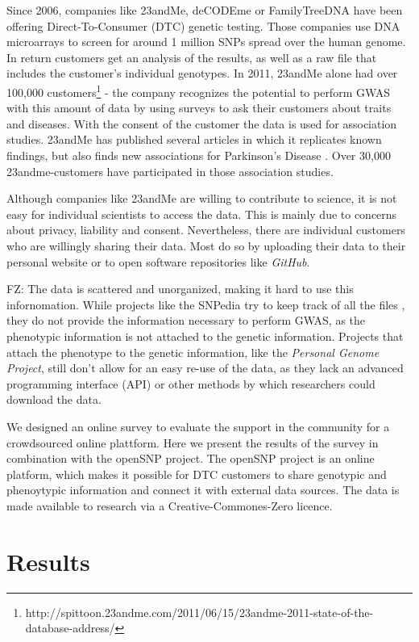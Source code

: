 \documentclass[10pt]{article}
\begin{document}
Since 2006, companies like 23andMe, deCODEme or FamilyTreeDNA have been offering Direct-To-Consumer (DTC) genetic testing. Those companies use DNA microarrays to screen for around 1 million SNPs spread over the human genome. In return customers get an analysis of the results, as well as a raw file that includes the customer's individual genotypes. In 2011, 23andMe alone had over 100,000 customers\footnote{http://spittoon.23andme.com/2011/06/15/23andme-2011-state-of-the-database-address/} - the company recognizes the potential to perform GWAS with this amount of data by using surveys to ask their customers about traits and diseases. With the consent of the customer the data is used for association studies. 23andMe has published several articles in which it replicates known findings, but also finds new associations for Parkinson's Disease \cite{Eriksson2010, Do2011}. Over 30,000 23andme-customers have participated in those association studies.  

Although companies like 23andMe are willing to contribute to science, it is not easy for individual scientists to access the data. This is mainly due to concerns about privacy, liability and consent. Nevertheless, there are individual customers who are willingly sharing their data. Most do so by uploading their data to their personal website or to open software repositories like \textit{GitHub}. 

FZ: The data is scattered and unorganized, making it hard to use this infornomation. While projects like the SNPedia try to keep track of all the files \cite{Cariaso2011}, they do not provide the information necessary to perform GWAS, as the phenotypic information is not attached to the genetic information. Projects that attach the phenotype to the genetic information, like the \textit{Personal Genome Project}, still don't allow for an easy re-use of the data, as they lack an advanced programming interface (API) or other methods by which researchers could download the data.  

We designed an online survey to evaluate the support in the community for a crowdsourced online plattform. Here we present the results of the survey in combination with the openSNP project. The openSNP project is an online platform, which makes it possible for DTC customers to share genotypic and phenoytypic information and connect it with external data sources. The data is made available to research via a Creative-Commones-Zero licence.

\section*{Results}
\end{document}
